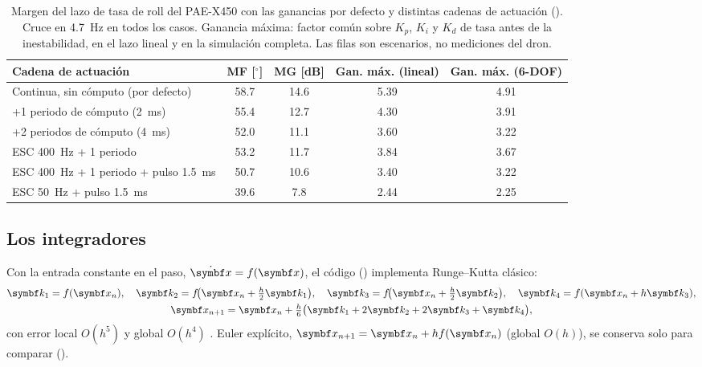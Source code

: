 \begin{table}[H]
\centering
\small
\caption{Margen del lazo de tasa de roll del PAE-X450 con las ganancias por
defecto y distintas cadenas de actuación
(). Cruce en 4.7~Hz en todos los
casos. Ganancia máxima: factor común sobre $K_p$, $K_i$ y $K_d$ de tasa antes
de la inestabilidad, en el lazo lineal y en la simulación completa. Las
filas son escenarios, no mediciones del dron.}
\label{tab:margenes}
\begin{tabular}{lcccc}
\toprule
Cadena de actuación & MF [$^\circ$] & MG [dB] & Gan. máx. (lineal) & Gan. máx. (6-DOF) \\
\midrule
Continua, sin cómputo (por defecto) & 58.7 & 14.6 & 5.39 & 4.91 \\
+1 periodo de cómputo (2~ms) & 55.4 & 12.7 & 4.30 & 3.91 \\
+2 periodos de cómputo (4~ms) & 52.0 & 11.1 & 3.60 & 3.22 \\
ESC 400~Hz + 1 periodo & 53.2 & 11.7 & 3.84 & 3.67 \\
ESC 400~Hz + 1 periodo + pulso 1.5~ms & 50.7 & 10.6 & 3.40 & 3.22 \\
ESC 50~Hz + pulso 1.5~ms & 39.6 & 7.8 & 2.44 & 2.25 \\
\bottomrule
\end{tabular}
\end{table}

\subsection{Los integradores}

Con la entrada constante en el paso, $\dot{\vect x}=f(\vect x)$, el código
() implementa Runge--Kutta clásico:
\begin{equation}
\begin{gathered}
\vect k_1=f(\vect x_n),\quad
\vect k_2=f\!\big(\vect x_n+\tfrac{h}{2}\vect k_1\big),\quad
\vect k_3=f\!\big(\vect x_n+\tfrac{h}{2}\vect k_2\big),\quad
\vect k_4=f(\vect x_n+h\vect k_3),\\
\vect x_{n+1}=\vect x_n+\tfrac{h}{6}\big(\vect k_1+2\vect k_2+2\vect k_3+\vect k_4\big),
\end{gathered}
\label{eq:rk4}
\end{equation}
con error local $O(h^5)$ y global $O(h^4)$ \cite{hairer93}. Euler explícito,
$\vect x_{n+1}=\vect x_n+h f(\vect x_n)$ (global $O(h)$), se conserva solo
para comparar ().


